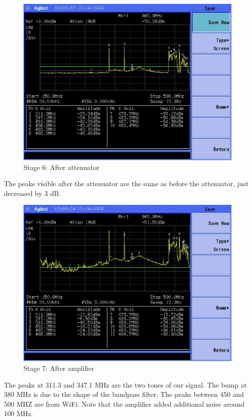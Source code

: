 \documentclass[letterpaper,12pt]{article}
\begin{document}
\begin{figure}[H]
	\begin{centering}
		\includegraphics[width=0.5\columnwidth]{figures/receiver_spectra/6.attenuator}
		\caption{Stage 6: After attenuator}
	\end{centering}
\end{figure}
\noindent
The peaks visible after the attenuator are the same as before the attenuator, just decreased by 3 dB.

\begin{figure}[H]
	\begin{centering}
		\includegraphics[width=0.5\columnwidth]{figures/receiver_spectra/7.amp}
		\caption{Stage 7: After amplifier}
	\end{centering}
\end{figure}
\noindent
The peaks at 311.3 and 347.1 MHz are the two tones of our signal. The bump at 380 MHz is due to the shape of the bandpass filter. The peaks between 450 and 500 MHZ are from WiFi. Note that the amplifier added additional noise around 100 MHz.
\end{document}

